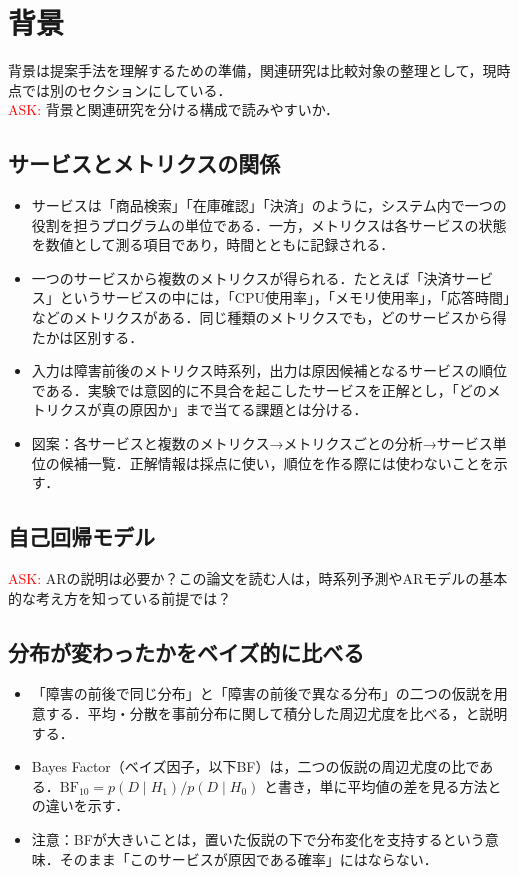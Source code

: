 \section{背景}
\label{sec:background}
背景は提案手法を理解するための準備，関連研究は比較対象の整理として，現時点では別のセクションにしている．\\
\textcolor{red}{ASK:} 背景と関連研究を分ける構成で読みやすいか．

\subsection{サービスとメトリクスの関係}
\begin{itemize}
    \item サービスは「商品検索」「在庫確認」「決済」のように，システム内で一つの役割を担うプログラムの単位である．一方，メトリクスは各サービスの状態を数値として測る項目であり，時間とともに記録される．
    \item 一つのサービスから複数のメトリクスが得られる．たとえば「決済サービス」というサービスの中には，「CPU使用率」，「メモリ使用率」，「応答時間」などのメトリクスがある．同じ種類のメトリクスでも，どのサービスから得たかは区別する．
    \item 入力は障害前後のメトリクス時系列，出力は原因候補となるサービスの順位である．実験では意図的に不具合を起こしたサービスを正解とし，「どのメトリクスが真の原因か」まで当てる課題とは分ける．
    \item 図案：各サービスと複数のメトリクス→メトリクスごとの分析→サービス単位の候補一覧．正解情報は採点に使い，順位を作る際には使わないことを示す．
\end{itemize}

\subsection{自己回帰モデル}
\textcolor{red}{ASK:} ARの説明は必要か？この論文を読む人は，時系列予測やARモデルの基本的な考え方を知っている前提では？

\subsection{分布が変わったかをベイズ的に比べる}
\begin{itemize}
    \item 「障害の前後で同じ分布」と「障害の前後で異なる分布」の二つの仮説を用意する．平均・分散を事前分布に関して積分した周辺尤度を比べる，と説明する．
    \item Bayes Factor（ベイズ因子，以下BF）は，二つの仮説の周辺尤度の比である．$\mathrm{BF}_{10}=p(D\mid H_1)/p(D\mid H_0)$ と書き，単に平均値の差を見る方法との違いを示す．
    \item 注意：BFが大きいことは，置いた仮説の下で分布変化を支持するという意味．そのまま「このサービスが原因である確率」にはならない．
\end{itemize}
